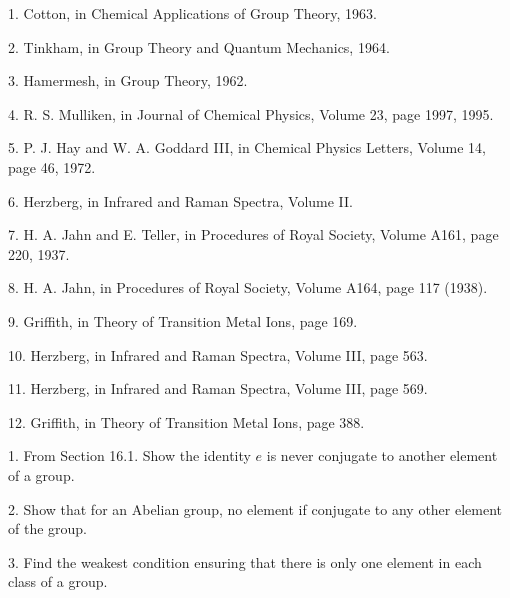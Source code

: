 \bigskip


\item {1.} Cotton, in Chemical Applications of Group Theory, 1963.

\item {2.} Tinkham, in Group Theory and Quantum Mechanics, 1964.

\item {3.} Hamermesh, in Group Theory, 1962.

\item {4.} R. S. Mulliken, in Journal of Chemical Physics, Volume 
23, page 1997, 1995.

\item {5.} P. J. Hay and W. A. Goddard III, in Chemical Physics 
Letters, Volume 14, page 46, 1972.

\item {6.} Herzberg, in Infrared and Raman Spectra, Volume II.

\item {7.} H. A. Jahn and E. Teller, in Procedures of Royal Society, 
Volume A161, page 220, 1937.

\item {8.} H. A. Jahn, in Procedures of Royal Society, Volume A164, 
page 117 (1938).

\item {9.} Griffith, in Theory of Transition Metal Ions, page 169.

\item {10.} Herzberg, in Infrared and Raman Spectra, Volume III, page 
563.

\item {11.} Herzberg, in Infrared and Raman Spectra, Volume III, page 
569.

\item {12.} Griffith, in Theory of Transition Metal Ions, page 388.

\bigskip


\item {1.} From Section 16.1.  Show the identity $e$ is never conjugate 
to another element of a group.

\item {2.} Show that for an Abelian group, no element if conjugate to 
any other element of the group.

\item {3.} Find the weakest condition ensuring that there is only one 
element in each class of a group.

